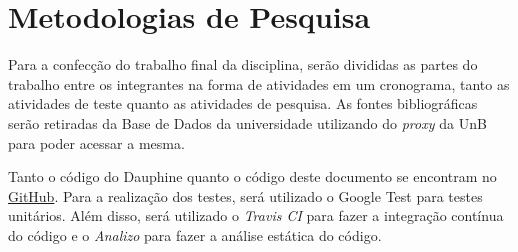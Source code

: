 \chapter[Metodologias de Pesquisa]{Metodologias de Pesquisa}

Para a confecção do trabalho final da disciplina, serão divididas as partes do trabalho entre os integrantes na forma de atividades em um cronograma, tanto as atividades de teste quanto as atividades de pesquisa. As fontes bibliográficas serão retiradas da Base de Dados da universidade utilizando do \textit{proxy} da UnB para poder acessar a mesma. 

Tanto o código do Dauphine quanto o código deste documento se encontram no \href{https://github.com/CaioIcy/Dauphine}{GitHub}. Para a realização dos testes, será utilizado o Google Test para testes unitários. Além disso, será utilizado o \textit{Travis CI} para fazer a integração contínua do código e o \textit{Analizo} para fazer a análise estática do código.
